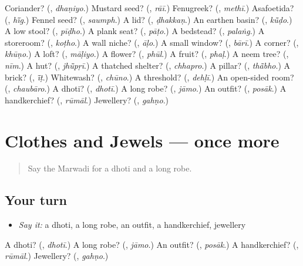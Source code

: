 \begin{tcolorbox}[breakable,colback=teal!4,colframe=teal!35!black,title={Before you move on}]
Coriander? (\textbf{}, \emph{dhaṇiyo}.) Mustard seed? (\textbf{}, \emph{rāī}.) Fenugreek? (\textbf{}, \emph{methī}.) Asafoetida? (\textbf{}, \emph{hī̃g}.) Fennel seed? (\textbf{}, \emph{saumph}.) A lid? (\textbf{}, \emph{ḍhakkaṇ}.) An earthen basin? (\textbf{}, \emph{kū̃ḍo}.) A low stool? (\textbf{}, \emph{pīḍho}.) A plank seat? (\textbf{}, \emph{pāṭo}.) A bedstead? (\textbf{}, \emph{palaṅg}.) A storeroom? (\textbf{}, \emph{koṭho}.) A wall niche? (\textbf{}, \emph{āḷo}.) A small window? (\textbf{}, \emph{bārī}.) A corner? (\textbf{}, \emph{khūṇo}.) A loft? (\textbf{}, \emph{māḷiyo}.) A flower? (\textbf{}, \emph{phūl}.) A fruit? (\textbf{}, \emph{phaḷ}.) A neem tree? (\textbf{}, \emph{nīm}.) A hut? (\textbf{}, \emph{jhū̃pṛī}.) A thatched shelter? (\textbf{}, \emph{chhapro}.) A pillar? (\textbf{}, \emph{thā̃bho}.) A brick? (\textbf{}, \emph{ī̃ṭ}.) Whitewash? (\textbf{}, \emph{chūno}.) A threshold? (\textbf{}, \emph{dehḷī}.) An open-sided room? (\textbf{}, \emph{chaubāro}.) A dhoti? (\textbf{}, \emph{dhotī}.) A long robe? (\textbf{}, \emph{jāmo}.) An outfit? (\textbf{}, \emph{posāk}.) A handkerchief? (\textbf{}, \emph{rūmāl}.) Jewellery? (\textbf{}, \emph{gahṇo}.)
\end{tcolorbox}
\section[(dialogue)]{Clothes and Jewels — once more}

\label{lesson:MW-R190-review-final-190}



\begin{quote}
Say the Marwadi for a dhoti and a long robe.
\end{quote}

\subsection*{Your turn}
\begin{itemize}
\raggedright
  \item \emph{Say it:} a dhoti, a long robe, an outfit, a handkerchief, jewellery
\end{itemize}

\begin{tcolorbox}[breakable,colback=teal!4,colframe=teal!35!black,title={Before you move on}]
A dhoti? (\textbf{}, \emph{dhotī}.) A long robe? (\textbf{}, \emph{jāmo}.) An outfit? (\textbf{}, \emph{posāk}.) A handkerchief? (\textbf{}, \emph{rūmāl}.) Jewellery? (\textbf{}, \emph{gahṇo}.)
\end{tcolorbox}

